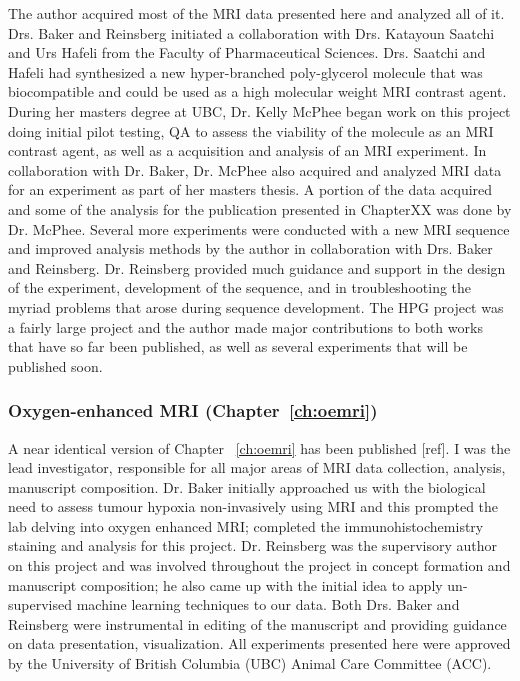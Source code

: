 The author acquired most of the MRI data presented here and analyzed all of it.
Drs. Baker and Reinsberg initiated a collaboration with Drs. Katayoun Saatchi and Urs Hafeli from the Faculty of Pharmaceutical Sciences.
Drs. Saatchi and Hafeli had synthesized a new hyper-branched poly-glycerol molecule that was biocompatible and could be used as a high molecular weight MRI contrast agent.
During her masters degree at UBC, Dr. Kelly McPhee began work on this project doing initial pilot testing, QA to assess the viability of the molecule as an MRI contrast agent, as well as a acquisition and analysis of an MRI experiment.
In collaboration with Dr. Baker, Dr. McPhee also acquired and analyzed MRI data for an experiment as part of her masters thesis. 
A portion of the data acquired and some of the analysis for the publication presented in ChapterXX was done by Dr. McPhee.
Several more experiments were conducted with a new MRI sequence and improved analysis methods by the author in collaboration with Drs. Baker and Reinsberg. 
Dr.  Reinsberg provided much guidance and support in the design of the experiment, development of the sequence, and in troubleshooting the myriad problems that arose during sequence development.
The HPG project was a fairly large project and the author made major contributions to both works that have so far been published, as well as several experiments that will be published soon.

\subsubsection{Oxygen-enhanced MRI (Chapter~\ref{ch:oemri})}

A near identical version of Chapter ~\ref{ch:oemri} has been published [ref]. 
I was the lead investigator, responsible for all major areas of MRI data collection, analysis, manuscript composition. 
Dr. Baker initially approached us with the biological need to assess tumour hypoxia non-invasively using MRI and this prompted the lab delving into oxygen enhanced MRI; completed the immunohistochemistry staining and analysis for this project.
Dr. Reinsberg was the supervisory author on this project and was involved throughout the project in concept formation and manuscript composition; he also came up with the initial idea to apply un-supervised machine learning techniques to our data. 
Both Drs. Baker and Reinsberg were instrumental in editing of the manuscript and providing guidance on data presentation, visualization.
All experiments presented here were approved by the University of British Columbia (UBC) Animal Care Committee (ACC).















